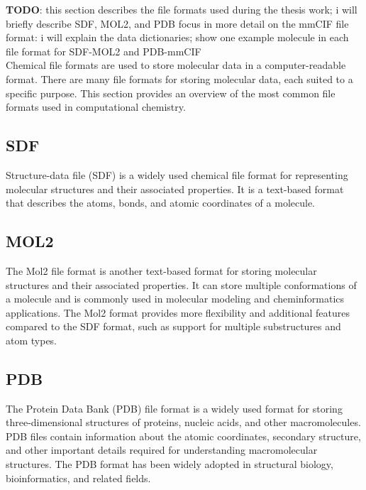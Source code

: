 \documentclass[
  digital,     %
  oneside,     %
  nosansbold,  %
  nocolorbold, %
  lof,         %
  lot,         %
]{fithesis4}
\begin{document}
\textbf{TODO}: this section describes the file formats used during the thesis work; i will briefly describe SDF, MOL2, and PDB focus in more detail on the mmCIF file format: i will explain the data dictionaries; show one example molecule in each file format for SDF-MOL2 and PDB-mmCIF \\

Chemical file formats are used to store molecular data in a computer-readable format. There are many file formats for storing molecular data, each suited to a specific purpose. This section provides an overview of the most common file formats used in computational chemistry.

\subsection{SDF}
\label{subsection:sdf}

Structure-data file (SDF) is a widely used chemical file format for representing molecular structures and their associated properties. It is a text-based format that describes the atoms, bonds, and atomic coordinates of a molecule. 

\subsection{MOL2}
\label{subsection:mol2}

The Mol2 file format is another text-based format for storing molecular structures and their associated properties. It can store multiple conformations of a molecule and is commonly used in molecular modeling and cheminformatics applications. The Mol2 format provides more flexibility and additional features compared to the SDF format, such as support for multiple substructures and atom types.

\subsection{PDB}
\label{subsection:pdb}

\cite{gu2009structural}

The Protein Data Bank (PDB) file format is a widely used format for storing three-dimensional structures of proteins, nucleic acids, and other macromolecules. PDB files contain information about the atomic coordinates, secondary structure, and other important details required for understanding macromolecular structures. The PDB format has been widely adopted in structural biology, bioinformatics, and related fields.
\end{document}
